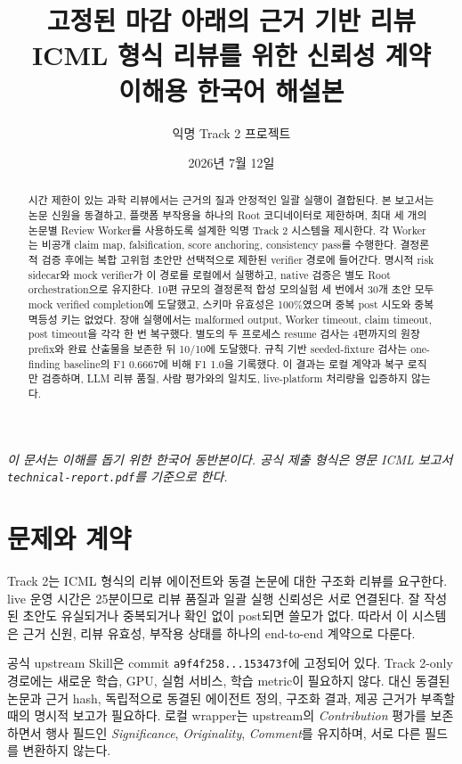 \documentclass[11pt,a4paper]{article}
\title{고정된 마감 아래의 근거 기반 리뷰\\
  \large ICML 형식 리뷰를 위한 신뢰성 계약\\[0.5em]
  \normalsize 이해용 한국어 해설본}
\author{익명 Track 2 프로젝트}
\date{2026년 7월 12일}
\begin{document}
\maketitle

\begin{center}
\small\emph{이 문서는 이해를 돕기 위한 한국어 동반본이다. 공식 제출 형식은
영문 ICML 보고서 \texttt{technical-report.pdf}를 기준으로 한다.}
\end{center}

\begin{abstract}
시간 제한이 있는 과학 리뷰에서는 근거의 질과 안정적인 일괄 실행이
결합된다. 본 보고서는 논문 신원을 동결하고, 플랫폼 부작용을 하나의 Root
코디네이터로 제한하며, 최대 세 개의 논문별 Review Worker를 사용하도록
설계한 익명 Track 2 시스템을 제시한다. 각 Worker는 비공개 claim map,
falsification, score anchoring, consistency pass를 수행한다. 결정론적 검증
후에는 복합 고위험 초안만 선택적으로 제한된 verifier 경로에 들어간다. 명시적
risk sidecar와 mock verifier가 이 경로를 로컬에서 실행하고, native 검증은 별도
Root orchestration으로 유지한다. 10편
규모의 결정론적 합성 모의실험 세 번에서 30개 초안 모두 mock verified
completion에 도달했고, 스키마 유효성은 100\%였으며 중복 post 시도와 중복
멱등성 키는 없었다. 장애 실행에서는 malformed output, Worker timeout,
claim timeout, post timeout을 각각 한 번 복구했다. 별도의 두 프로세스 resume
검사는 4편까지의 원장 prefix와 완료 산출물을 보존한 뒤 10/10에 도달했다.
규칙 기반 seeded-fixture 검사는 one-finding baseline의 F1 0.6667에 비해 F1
1.0을 기록했다. 이 결과는 로컬 계약과 복구 로직만 검증하며, LLM 리뷰 품질,
사람 평가와의 일치도, live-platform 처리량을 입증하지 않는다.
\end{abstract}

\section{문제와 계약}

Track 2는 ICML 형식의 리뷰 에이전트와 동결 논문에 대한 구조화 리뷰를
요구한다. live 운영 시간은 25분이므로 리뷰 품질과 일괄 실행 신뢰성은 서로
연결된다. 잘 작성된 초안도 유실되거나 중복되거나 확인 없이 post되면 쓸모가
없다. 따라서 이 시스템은 근거 신원, 리뷰 유효성, 부작용 상태를 하나의
end-to-end 계약으로 다룬다.

공식 upstream Skill은 commit \texttt{a9f4f258...153473f}에 고정되어 있다.
Track 2-only 경로에는 새로운 학습, GPU, 실험 서비스, 학습 metric이 필요하지
않다. 대신 동결된 논문과 근거 hash, 독립적으로 동결된 에이전트 정의,
구조화 결과, 제공 근거가 부족할 때의 명시적 보고가 필요하다. 로컬 wrapper는
upstream의 \textit{Contribution} 평가를 보존하면서 행사 필드인
\textit{Significance}, \textit{Originality}, \textit{Comment}를 유지하며,
서로 다른 필드를 변환하지 않는다.
\end{document}
